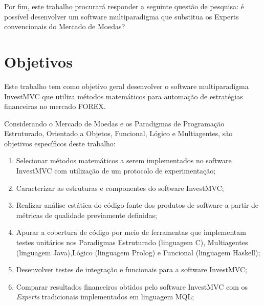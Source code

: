 Por fim, este trabalho procurará responder a seguinte questão de pesquisa: é possível desenvolver um software multiparadigma que substitua os Experts convencionais do Mercado de Moedas?

\section{Objetivos}
Este trabalho tem como objetivo geral desenvolver o software multiparadigma InvestMVC que utiliza métodos matemáticos para automação de estratégias financeiras no mercado FOREX.

Considerando o Mercado de Moedas e os Paradigmas de Programação Estruturado, Orientado a Objetos, Funcional, Lógico e Multiagentes, são objetivos específicos deste trabalho:

\begin{enumerate}
\item  Selecionar métodos matemáticos a serem implementados no software InvestMVC com utilização de um protocolo de experimentação;

\item Caracterizar as estruturas e componentes do software InvestMVC;

\item Realizar análise estática do código fonte dos produtos de software a partir de métricas de qualidade previamente definidas;

\item  Apurar a cobertura de código por meio de ferramentas que implementam testes unitários nos Paradigmas Estruturado (linguagem C), Multiagentes (linguagem Java),Lógico (linguagem Prolog) e Funcional (linguagem Haskell);

\item Desenvolver testes de integração e funcionais para a software InvestMVC;

\item Comparar resultados financeiros obtidos pelo software InvestMVC com os \textit{Experts} tradicionais implementados em linguagem MQL;
\end{enumerate}

